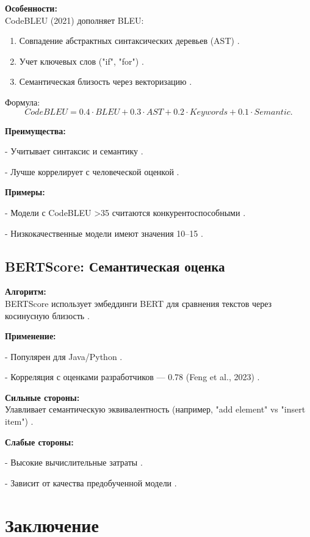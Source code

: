 \documentclass[14pt]{article}
\theoremstyle{definition}
\begin{document}
\textbf{Особенности:} \\
CodeBLEU (2021) дополняет BLEU:
\begin{enumerate}
    \item Совпадение абстрактных синтаксических деревьев (AST) \cite{ren2021}.
    \item Учет ключевых слов ("if", "for") \cite{allamanis2019adverse}.
    \item Семантическая близость через векторизацию \cite{guo2022unixcoder}.
\end{enumerate}

Формула:
\[
CodeBLEU = 0.4 \cdot BLEU + 0.3 \cdot AST + 0.2 \cdot Keywords + 0.1 \cdot Semantic.
\]

\textbf{Преимущества:}

    
- Учитывает синтаксис и семантику \cite{ren2021}.
    
- Лучше коррелирует с человеческой оценкой \cite{chen2023}.


\textbf{Примеры:}

    
- Модели с CodeBLEU >35 считаются конкурентоспособными \cite{wan2023codet5+}.
    
- Низкокачественные модели имеют значения 10–15 \cite{feng2023}.


\subsection{BERTScore: Семантическая оценка}

\textbf{Алгоритм:} \\
BERTScore использует эмбеддинги BERT для сравнения текстов через косинусную близость \cite{zhang2020}.

\textbf{Применение:}

    
- Популярен для Java/Python \cite{guo2022unixcoder}.
    
- Корреляция с оценками разработчиков — 0.78 (Feng et al., 2023) \cite{feng2023}.


\textbf{Сильные стороны:} \\
Улавливает семантическую эквивалентность (например, "add element" vs "insert item") \cite{zhou2022devign}.

\textbf{Слабые стороны:}

    
- Высокие вычислительные затраты \cite{zhang2020}.
    
- Зависит от качества предобученной модели \cite{feng2020codebert}.




\newpage
\section{Заключение}
\end{document}
